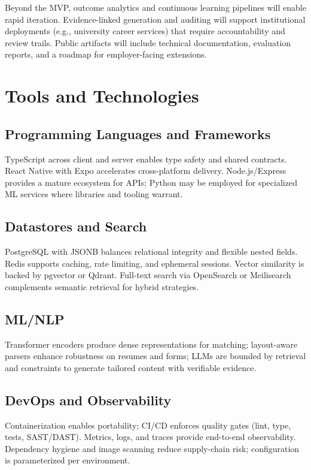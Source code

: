 \documentclass[12pt,a4paper]{report}
\begin{document}
Beyond the MVP, outcome analytics and continuous learning pipelines will enable rapid iteration. Evidence-linked generation and auditing will support institutional deployments (e.g., university career services) that require accountability and review trails. Public artifacts will include technical documentation, evaluation reports, and a roadmap for employer-facing extensions.

\chapter{Tools and Technologies}
\section{Programming Languages and Frameworks}
TypeScript across client and server enables type safety and shared contracts. React Native with Expo accelerates cross-platform delivery. Node.js/Express provides a mature ecosystem for APIs; Python may be employed for specialized ML services where libraries and tooling warrant.

\section{Datastores and Search}
PostgreSQL with JSONB balances relational integrity and flexible nested fields. Redis supports caching, rate limiting, and ephemeral sessions. Vector similarity is backed by pgvector or Qdrant. Full-text search via OpenSearch or Meilisearch complements semantic retrieval for hybrid strategies.

\section{ML/NLP}
Transformer encoders produce dense representations for matching; layout-aware parsers enhance robustness on resumes and forms; LLMs are bounded by retrieval and constraints to generate tailored content with verifiable evidence.

\section{DevOps and Observability}
Containerization enables portability; CI/CD enforces quality gates (lint, type, tests, SAST/DAST). Metrics, logs, and traces provide end-to-end observability. Dependency hygiene and image scanning reduce supply-chain risk; configuration is parameterized per environment.
\end{document}
